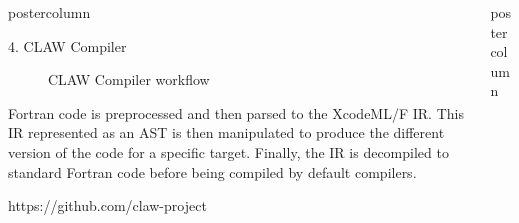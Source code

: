 \documentclass{beamer}
\newlength{\columnheight}
\begin{document}
\begin{frame}
\begin{columns}
\begin{column}{.37\textwidth}
\begin{beamercolorbox}[center]{postercolumn}
\begin{minipage}{.98\textwidth}
{\begin{myblock}{4. CLAW Compiler}
\begin{figure}
  \caption[CLAW Compiler workflow]{CLAW Compiler workflow}
  \label{fig:clawfc}
\end{figure}

Fortran code is preprocessed and then parsed to the XcodeML/F\cite{XcodeML17}
IR. This IR represented as an AST is then manipulated to produce the different
version of the code for a specific target. Finally, the IR is decompiled to
standard Fortran code before being compiled by default compilers.

\clawb

 https://github.com/claw-project

\end{myblock}%



}\end{minipage}\end{beamercolorbox}
\end{column}

%
%
\begin{column}{.38\textwidth}
\begin{beamercolorbox}[center]{postercolumn}
\begin{minipage}{.98\textwidth} %
\parbox[t][\columnheight]{\textwidth}{ %


}
\end{minipage}
\end{beamercolorbox}
\end{column}
\end{columns}
\end{frame}
\end{document}

